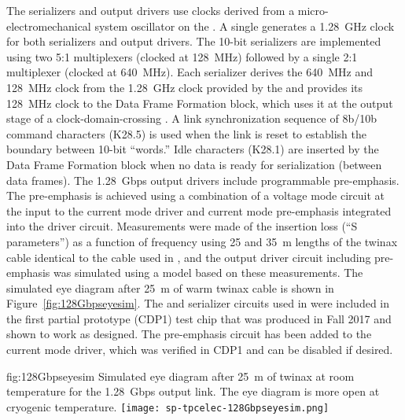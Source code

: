 The serializers and output drivers use clocks derived from a micro-electromechanical
system oscillator on the . A single  generates a 
\SI{1.28}{GHz} clock for both serializers and output drivers. The \num{10}-bit
serializers are implemented using two \num{5}:\num{1} multiplexers (clocked at \SI{128}{MHz}) 
followed by a single \num{2}:\num{1} multiplexer (clocked at \SI{640}{MHz}). Each serializer 
derives the \SI{640}{MHz} and \SI{128}{MHz} clock from the \SI{1.28}{GHz} 
clock provided by the  and provides its \SI{128}{MHz} clock to 
the Data Frame Formation block, which uses it at the output stage of a 
clock-domain-crossing . A link synchronization sequence of 8b/10b 
command characters (K28.5) is used when the link is reset to establish the 
boundary between \num{10}-bit ``words.'' Idle characters (K28.1) are inserted 
by the Data Frame Formation block when no data is ready for serialization 
(between data frames). The \SI{1.28}{Gbps} output drivers include programmable 
pre-emphasis. The pre-emphasis is achieved using a combination of a voltage 
mode circuit at the input to the current mode driver and current mode 
pre-emphasis integrated into the driver circuit. Measurements were made 
of the insertion loss (``S parameters'') as a function of frequency using
\num{25} and \SI{35}{m} lengths of the twinax cable identical to the 
cable used in , and the output driver circuit including 
pre-emphasis was simulated using a  model based on these 
measurements. The simulated eye diagram after \SI{25}{m} of warm twinax 
cable is shown in Figure~\ref{fig:128Gbpseyesim}. The  and 
serializer circuits used in  were included in the first partial prototype (CDP1) 
test chip that was produced in Fall 2017 and shown to work as designed.  
The pre-emphasis circuit has been added to the current mode driver, which 
was verified in CDP1 and can be disabled if desired. 

\begin{dunefigure}
{fig:128Gbpseyesim}
{Simulated eye diagram after \SI{25}{m} of  twinax at room 
temperature for the  \SI{1.28}{Gbps} output link.  
The eye diagram is more open at cryogenic temperature.}
\texttt{[image: sp-tpcelec-128Gbpseyesim.png]}
\end{dunefigure}

\label{sec:fdsp-tpcelec-design-femb-alt-cots}

